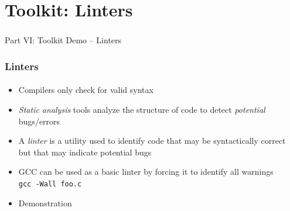 \documentclass[]{beamer}
\begin{document}
\section{Toolkit: Linters}

\begin{frame}
    \frametitle{}
    \framesubtitle{}
    
    \begin{center}
    {\Huge Part VI: Toolkit Demo -- Linters}\\
    {\Large }
    \end{center}

\end{frame}

\begin{frame}[fragile]
    \frametitle{Linters}
    \framesubtitle{}


\begin{itemize}[<+->]
  \item Compilers only check for valid syntax
  \item \emph{Static analysis} tools analyze the structure of code to detect \emph{potential} bugs/errors
  \item A \emph{linter} is a utility used to identify code that may be syntactically correct but that may indicate potential bugs
  \item GCC can be used as a basic linter by forcing it to identify all warnings \\
  \texttt{gcc -Wall foo.c}
  \item Demonstration 
\end{itemize}


\end{frame}
\end{document}

